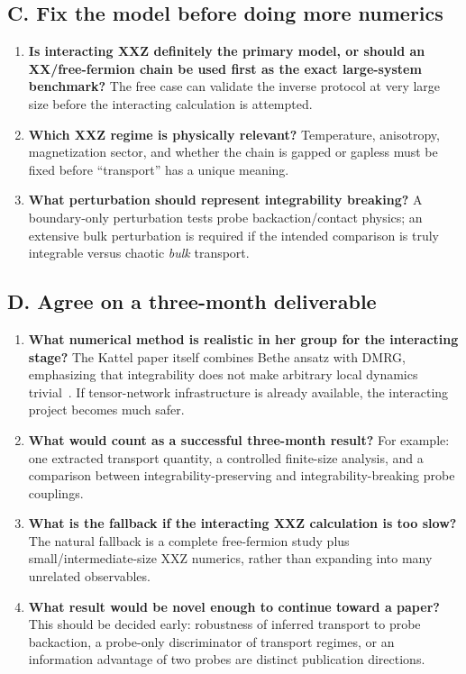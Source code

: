 \documentclass[11pt,a4paper]{article}
\begin{document}
\subsection*{C. Fix the model before doing more numerics}
\begin{enumerate}[label=\textbf{Q\arabic*.},resume,leftmargin=1.2cm]
    \item \textbf{Is interacting XXZ definitely the primary model, or should an XX/free-fermion chain be used first as the exact large-system benchmark?}  The free case can validate the inverse protocol at very large size before the interacting calculation is attempted.
    \item \textbf{Which XXZ regime is physically relevant?}  Temperature, anisotropy, magnetization sector, and whether the chain is gapped or gapless must be fixed before ``transport'' has a unique meaning.
    \item \textbf{What perturbation should represent integrability breaking?}  A boundary-only perturbation tests probe backaction/contact physics; an extensive bulk perturbation is required if the intended comparison is truly integrable versus chaotic \emph{bulk} transport.
\end{enumerate}

\subsection*{D. Agree on a three-month deliverable}
\begin{enumerate}[label=\textbf{Q\arabic*.},resume,leftmargin=1.2cm]
    \item \textbf{What numerical method is realistic in her group for the interacting stage?}  The Kattel paper itself combines Bethe ansatz with DMRG, emphasizing that integrability does not make arbitrary local dynamics trivial~\cite{kattel2025}.  If tensor-network infrastructure is already available, the interacting project becomes much safer.
    \item \textbf{What would count as a successful three-month result?}  For example: one extracted transport quantity, a controlled finite-size analysis, and a comparison between integrability-preserving and integrability-breaking probe couplings.
    \item \textbf{What is the fallback if the interacting XXZ calculation is too slow?}  The natural fallback is a complete free-fermion study plus small/intermediate-size XXZ numerics, rather than expanding into many unrelated observables.
    \item \textbf{What result would be novel enough to continue toward a paper?}  This should be decided early: robustness of inferred transport to probe backaction, a probe-only discriminator of transport regimes, or an information advantage of two probes are distinct publication directions.
\end{enumerate}
\end{document}
